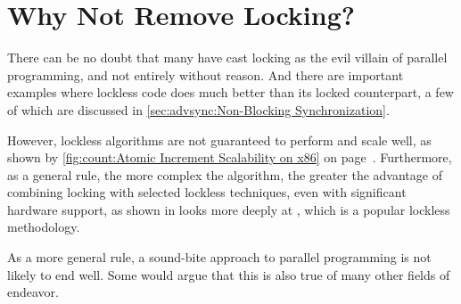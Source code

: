 
\section{Why Not Remove Locking?}
\label{sec:app:questions:Why Not Remove Locking?}

There can be no doubt that many have cast locking as the evil villain
of parallel programming, and not entirely without reason.
And there are important examples where lockless code does much better
than its locked counterpart, a few of which are discussed in
\cref{sec:advsync:Non-Blocking Synchronization}.

However, lockless algorithms are not guaranteed to perform and scale
well, as shown by
\cref{fig:count:Atomic Increment Scalability on x86} on
page~\pageref{fig:count:Atomic Increment Scalability on x86}.
Furthermore, as a general rule, the more complex the algorithm,
the greater the advantage of combining locking with selected
lockless techniques, even with significant hardware support,
as shown in
looks more deeply at , which is a popular
lockless methodology.

As a more general rule, a sound-bite approach to parallel programming
is not likely to end well.
Some would argue that this is also true of many other fields of endeavor.
